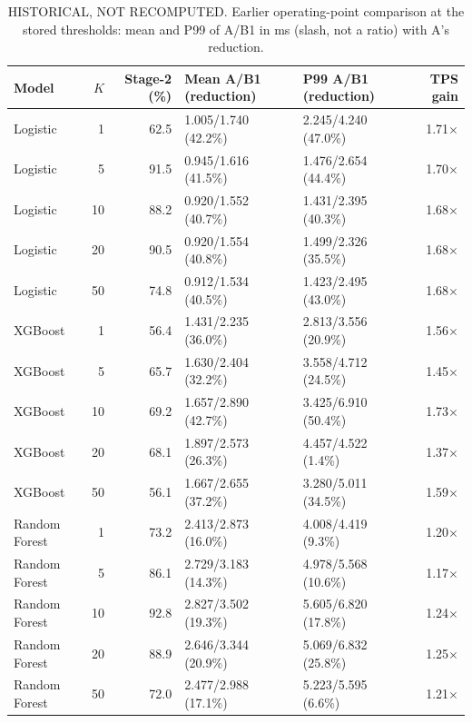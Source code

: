 \documentclass[10pt,a4paper]{article}
\begin{document}
\begin{table}[h]\centering\small
\caption{HISTORICAL, NOT RECOMPUTED. Earlier operating-point comparison at the stored thresholds: mean and P99 of A/B1 in ms (slash, not a ratio) with A's reduction.}
\begin{tabular*}{\linewidth}{@{\extracolsep{\fill}}l r r l l r@{}}
\toprule
Model & $K$ & Stage-2 (\%) & Mean A/B1 (reduction) & P99 A/B1 (reduction) & TPS gain \\
\midrule
Logistic & 1 & 62.5 & 1.005/1.740 (42.2\%) & 2.245/4.240 (47.0\%) & 1.71$\times$ \\
Logistic & 5 & 91.5 & 0.945/1.616 (41.5\%) & 1.476/2.654 (44.4\%) & 1.70$\times$ \\
Logistic & 10 & 88.2 & 0.920/1.552 (40.7\%) & 1.431/2.395 (40.3\%) & 1.68$\times$ \\
Logistic & 20 & 90.5 & 0.920/1.554 (40.8\%) & 1.499/2.326 (35.5\%) & 1.68$\times$ \\
Logistic & 50 & 74.8 & 0.912/1.534 (40.5\%) & 1.423/2.495 (43.0\%) & 1.68$\times$ \\
XGBoost & 1 & 56.4 & 1.431/2.235 (36.0\%) & 2.813/3.556 (20.9\%) & 1.56$\times$ \\
XGBoost & 5 & 65.7 & 1.630/2.404 (32.2\%) & 3.558/4.712 (24.5\%) & 1.45$\times$ \\
XGBoost & 10 & 69.2 & 1.657/2.890 (42.7\%) & 3.425/6.910 (50.4\%) & 1.73$\times$ \\
XGBoost & 20 & 68.1 & 1.897/2.573 (26.3\%) & 4.457/4.522 (1.4\%) & 1.37$\times$ \\
XGBoost & 50 & 56.1 & 1.667/2.655 (37.2\%) & 3.280/5.011 (34.5\%) & 1.59$\times$ \\
Random Forest & 1 & 73.2 & 2.413/2.873 (16.0\%) & 4.008/4.419 (9.3\%) & 1.20$\times$ \\
Random Forest & 5 & 86.1 & 2.729/3.183 (14.3\%) & 4.978/5.568 (10.6\%) & 1.17$\times$ \\
Random Forest & 10 & 92.8 & 2.827/3.502 (19.3\%) & 5.605/6.820 (17.8\%) & 1.24$\times$ \\
Random Forest & 20 & 88.9 & 2.646/3.344 (20.9\%) & 5.069/6.832 (25.8\%) & 1.25$\times$ \\
Random Forest & 50 & 72.0 & 2.477/2.988 (17.1\%) & 5.223/5.595 (6.6\%) & 1.21$\times$ \\
\bottomrule
\end{tabular*}
\end{table}
\end{document}
